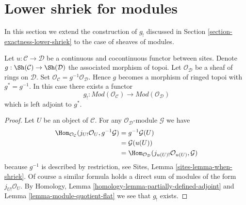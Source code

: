\section{Lower shriek for modules}
\label{section-lower-shriek-modules}

\noindent
In this section we extend the construction of $g_!$ discussed
in Section \ref{section-exactness-lower-shriek} to the case of
sheaves of modules.

\begin{lemma}
\label{lemma-lower-shriek-modules}
Let $u : \mathcal{C} \to \mathcal{D}$ be a continuous and cocontinuous
functor between sites. Denote
$g : \Sh(\mathcal{C}) \to \Sh(\mathcal{D})$ the associated
morphism of topoi. Let $\mathcal{O}_\mathcal{D}$ be a sheaf of rings
on $\mathcal{D}$. Set
$\mathcal{O}_\mathcal{C} = g^{-1}\mathcal{O}_\mathcal{D}$.
Hence $g$ becomes a morphism of ringed topoi with $g^* = g^{-1}$.
In this case there exists a functor
$$
g_! :
\textit{Mod}(\mathcal{O}_\mathcal{C})
\longrightarrow
\textit{Mod}(\mathcal{O}_\mathcal{D})
$$
which is left adjoint to $g^*$.
\end{lemma}

\begin{proof}
Let $U$ be an object of $\mathcal{C}$. For any
$\mathcal{O}_\mathcal{D}$-module $\mathcal{G}$ we have
\begin{align*}
\Hom_{\mathcal{O}_\mathcal{C}}(j_{U!}\mathcal{O}_U, g^{-1}\mathcal{G})
& =
g^{-1}\mathcal{G}(U) \\
& =
\mathcal{G}(u(U)) \\
& =
\Hom_{\mathcal{O}_\mathcal{D}}(j_{u(U)!}\mathcal{O}_{u(U)}, \mathcal{G})
\end{align*}
because $g^{-1}$ is described by restriction, see
Sites, Lemma \ref{sites-lemma-when-shriek}.
Of course a similar formula holds a direct sum of modules
of the form $j_{U!}\mathcal{O}_U$. By
Homology, Lemma \ref{homology-lemma-partially-defined-adjoint}
and
Lemma \ref{lemma-module-quotient-flat}
we see that $g_!$ exists.
\end{proof}

